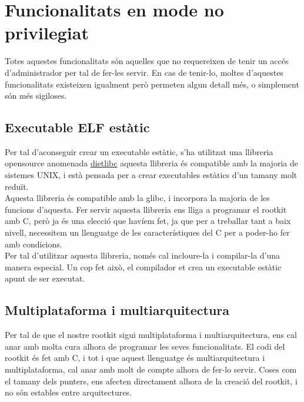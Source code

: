 \section{Funcionalitats en mode no privilegiat}

Totes aquestes funcionalitats són aquelles que no requereixen de tenir un accés d'administrador per tal de fer-les servir. En cas
de tenir-lo, moltes d'aquestes funcionalitats existeixen igualment però permeten algun detall més, o simplement són més 
sigiloses. 

\subsection{Executable ELF estàtic}

Per tal d'aconseguir crear un executable estàtic, s'ha utilitzat una llibreria opensource anomenada 
\href{http://www.google.es/url?sa=t&source=web&ct=res&cd=1&url=http%3A%2F%2Fwww.fefe.de%2Fdietlibc%2F&ei=zZRQStz4PMWrjAftmrinBQ&usg=AFQjCNFno9JYqJ06mbfgwKIZS5J-6zPYEw&sig2=WuvuDzhCaMMslcwtL4xa2A}{dietlibc}
aquesta llibreria és compatible amb la majoria de sistemes UNIX, i està pensada per a crear executables estàtics d'un tamany 
molt reduït. \\

Aquesta llibreria és compatible amb la glibc, i incorpora la majoria de les funcions d'aquesta. Fer servir aquesta llibreria
ens lliga a programar el rootkit amb C, però ja és una elecció que havíem fet, ja que per a treballar tant a baix nivell,
necessitem un llenguatge de les característiques del C per a poder-ho fer amb condicions.\\

Per tal d'utilitzar aquesta llibreria, només cal incloure-la i compilar-la d'una manera especial. Un cop fet això, el compilador et crea un 
executable estàtic apunt de ser executat.

\subsection{Multiplataforma i multiarquitectura}

Per tal de que el nostre rootkit sigui multiplataforma i multiarquitectura, ens cal anar amb molta cura alhora de programar les 
seves funcionalitats. El codi del rootkit és fet amb C, i tot i que aquest llenguatge és multiarquitectura i multiplataforma, cal 
anar amb molt de compte alhora de fer-lo servir. Coses com el tamany dels punters, ens afecten directament alhora de la creació
del rootkit, i no són estables entre arquitectures.

